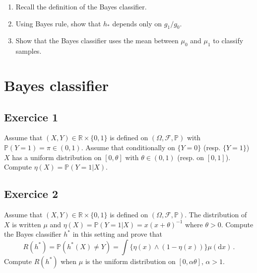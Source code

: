 \documentclass[a4paper,10pt,fleqn]{article}
\newcommand{\eqsp}{\,}
\newcommand{\rmd}{\mathrm{d}}
\newcommand{\rset}{\ensuremath{\mathbb{R}}}
\newcommand{\bP}{\mathbb{P}}
\newcommand{\1}{\ensuremath{\mathbbm{1}}}
\begin{document}
\begin{enumerate}
\item Recall the definition of the Bayes classifier.
%
%

\item Using Bayes rule, show that  $h_*$ depends only on $g_1/g_0$.
%
%

\item Show that the Bayes classifier uses the mean between  $\mu_0$ and  $\mu_1$ to classify samples.
%
%
\end{enumerate}



\section{Bayes classifier}
\subsection{Exercice 1}
Assume that $(X,Y)\in\mathbb{R}\times\{0,1\}$ is defined on $(\Omega,\mathcal{F},\mathbb{P})$ with $\mathbb{P}(Y=1) = \pi \in(0,1)$.  Assume that conditionally on $\{Y=0\}$ (resp. $\{Y=1\}$) $X$ has a uniform distribution on $[0,\theta]$ with $\theta\in(0,1)$ (resp. on $[0,1]$). Compute $\eta(X) = \mathbb{P}(Y=1 |X)$.

\subsection{Exercice 2}
Assume that $(X,Y)\in\mathbb{R}\times\{0,1\}$ is defined on $(\Omega,\mathcal{F},\mathbb{P})$. The distribution of $X$ is written $\mu$ and $\eta(X) = \mathbb{P}(Y=1|X) = x(x+\theta)^{-1}$ where $\theta>0$. Compute the Bayes classifier $h^*$ in this setting and prove that
$$
R(h^*) = \bP(h^*(X)\neq Y) = \int \{\eta(x) \wedge (1-\eta(x))\}\mu(\rmd x)\,.
$$
Compute $R(h^*)$ when $\mu$ is the uniform distribution on $[0,\alpha \theta]$, $\alpha>1$. 
\end{document}
